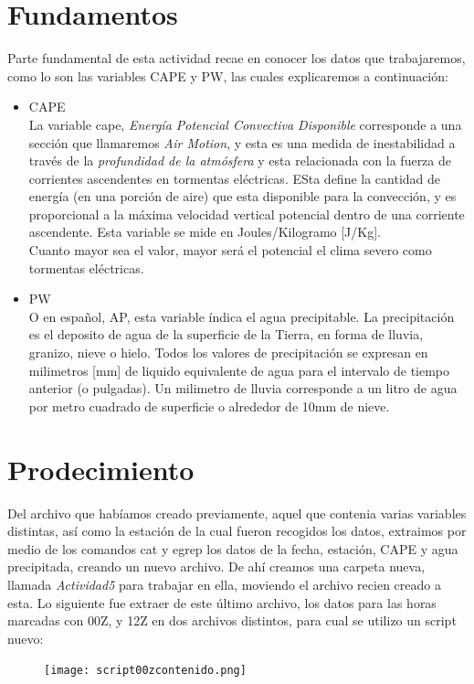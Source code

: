 \documentclass{article}
\begin{document}
\section{Fundamentos}
Parte fundamental de esta actividad recae en conocer los datos que trabajaremos, como lo son las variables CAPE y PW, las cuales explicaremos a continuación: 
\begin{itemize}
\item CAPE \\ La variable cape, \textit{Energía Potencial Convectiva Disponible} corresponde a una sección que llamaremos \textit{Air Motion}, y esta es una medida de inestabilidad a través de la \textit{profundidad de la atmósfera} y esta relacionada con la fuerza de corrientes ascendentes en tormentas eléctricas. ESta define la cantidad de energía (en una porción de aire) que esta disponible para la convección, y es proporcional a la máxima velocidad vertical potencial dentro de una corriente ascendente. Esta variable se mide en Joules/Kilogramo [J/Kg]. \\ Cuanto mayor sea el valor, mayor será el potencial el clima severo como tormentas eléctricas.
\item PW \\ O en español, AP, esta variable índica el agua precipitable. La precipitación es el deposito de agua de la superficie de la Tierra, en forma de lluvia, granizo, nieve o hielo. Todos los valores de precipitación se expresan en milimetros [mm] de liquido equivalente de agua para el intervalo de tiempo anterior (o pulgadas). Un milimetro de lluvia corresponde a un litro de agua por metro cuadrado de superficie o alrededor de 10mm de nieve.  
\end{itemize}
\section{Prodecimiento}
Del archivo que habíamos creado previamente, aquel que contenia varias variables distintas, así como la estación de la cual fueron recogidos los datos, extraimos por medio de los comandos cat y egrep los datos de la fecha, estación, CAPE y agua precipitada, creando un nuevo archivo. De ahí creamos una carpeta nueva, llamada \textit{Actividad5} para trabajar en ella, moviendo el archivo recien creado a esta. 
Lo siguiente fue extraer de este último archivo, los datos para las horas marcadas con 00Z, y 12Z en dos archivos distintos, para cual se utilizo un script nuevo: 

\begin{figure}[htb]
    \begin{center}
    \texttt{[image: script00zcontenido.png]}
    \end{center}
\end{figure}
\end{document}
